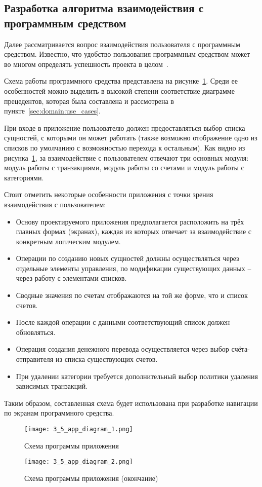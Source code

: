 \subsection{Разработка алгоритма взаимодействия с программным средством}
\label{sec:design:app}

Далее рассматривается вопрос взаимодействия пользователя с программным средством.
Известно, что удобство пользования программным средством может во многом определять успешность проекта в целом~\cite[с.~44]{code_complete}.

Схема работы программного средства представлена на рисунке~\ref{fig:design:app:diagram}.
Среди ее особенностей можно выделить в высокой степени соответствие диаграмме прецедентов, которая была составлена и рассмотрена в пункте~\ref{sec:domain:use_cases}.

При входе в приложение пользователю должен предоставляться выбор списка сущностей, с которыми он может работать (также возможно отображение одно из списков по умолчанию с возможностью перехода к остальным).
Как видно из рисунка~\ref{fig:design:app:diagram}, за взаимодействие с пользователем отвечают три основных модуля: модуль работы с транзакциями, модуль работы со счетами и модуль работы с категориями.

Стоит отметить некоторые особенности приложения с точки зрения взаимодействия с пользователем:
\begin{itemize}
    \item Основу проектируемого приложения предполагается расположить на трёх главных формах (экранах), каждая из которых отвечает за взаимодействие с конкретным логическим модулем.
    \item Операции по созданию новых сущностей должны осуществляться через отдельные элементы управления, по модификации существующих данных -- через работу с элементами списков.
    \item Сводные значения по счетам отображаются на той же форме, что и список счетов.
    \item После каждой операции с данными соответствующий список должен обновляться.
    \item Операция создания денежного перевода осуществляется через выбор счёта-отправителя из списка существующих счетов.
    \item При удалении категории требуется дополнительный выбор политики удаления зависимых транзакций.
\end{itemize}

Таким образом, составленная схема будет использована при разработке навигации по экранам программного средства.

\begin{figure}[p]
    \centering
    \texttt{[image: 3\_5\_app\_diagram\_1.png]}
    \caption{Схема программы приложения}
    \label{fig:design:app:diagram}
\end{figure}

\begin{sidewaysfigure}
    \centering
    \ContinuedFloat
    \texttt{[image: 3\_5\_app\_diagram\_2.png]}
    \caption{Схема программы приложения (окончание)}
\end{sidewaysfigure}

